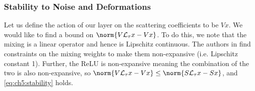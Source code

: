 \subsubsection{Stability to Noise and Deformations}
Let us define the action of our layer on the scattering
coefficients to be $Vx$. We would like to find a bound on $\norm{V\mathcal{L}_\tau x -
V x}$. To do this, we note that the mixing is a linear operator and hence is
Lipschitz continuous. The authors in \cite{qiu_dcfnet:_2018} find constraints on the mixing
weights to make them non-expansive (i.e. Lipschitz constant 1).
Further, the ReLU is non-expansive meaning the combination of the two is
also non-expansive, so $\norm{V\mathcal{L}_\tau x - V x} \leq \norm{S\mathcal{L}_\tau
x - Sx}$, and \eqref{eq:ch5:stability} holds.


